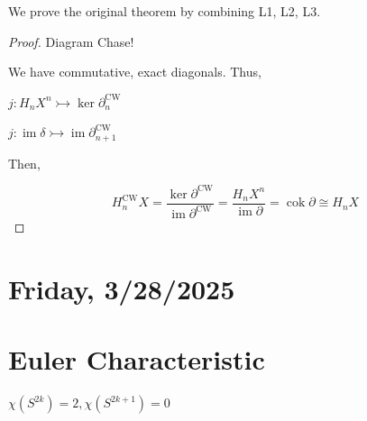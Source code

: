 \documentclass{article}
\theoremstyle{definition}
\begin{document}
    We prove the original theorem by combining L1, L2, L3.

    \begin{proof}
        Diagram Chase!

        \begin{center}
        \end{center}

        We have commutative, exact diagonals. Thus,

        \(j: H_n X^n \rightarrowtail \ker \partial_n^{\text{CW}}\)

        \(j: \operatorname{im} \delta \rightarrowtail \operatorname{im} \partial_{n+1}^{\text{CW}}\)

        Then,

        \[
            H_n^{\text{CW}} X = \frac{\ker \partial^{\text{CW}}}{\operatorname{im} \partial^{\text{CW}}} = \frac{H_n X^n}{\operatorname{im} \partial} = \operatorname{cok} \partial \cong H_n X
        \]
    \end{proof}

    \section*{Friday, 3/28/2025}
    
    \section*{Euler Characteristic}

    \(\chi(S^{2k}) = 2, \chi(S^{2k+1})=0\) 
\end{document}
